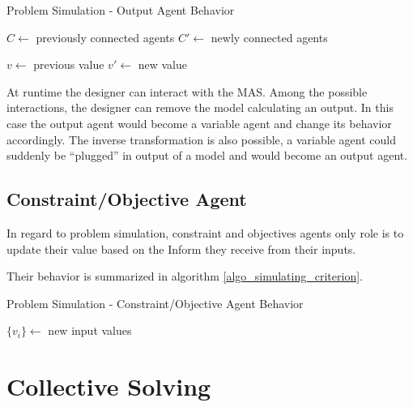 \begin{algorithm}
\caption{Problem Simulation - Output Agent Behavior}
\label{algo_simulating_output}

	$C \leftarrow$ previously connected agents\;
	$C'\leftarrow$ newly connected agents\;
		
	$v \leftarrow$ previous value\;
	$v'\leftarrow$ new value\;
	
	
	
\end{algorithm}

At runtime the designer can interact with the MAS. Among the possible interactions, the designer can remove the model calculating an output. In this case the output agent would become a variable agent and change its behavior accordingly. The inverse transformation is also possible, a variable agent could suddenly be \enquote{plugged} in output of a model and would become an output agent.

\subsection{Constraint/Objective Agent}

In regard to problem simulation, constraint and objectives agents only role is to update their value based on the Inform they receive from their inputs.

Their behavior is summarized in algorithm \ref{algo_simulating_criterion}.

\begin{algorithm}
\caption{Problem Simulation - Constraint/Objective Agent Behavior}
\label{algo_simulating_criterion}

	$\{v_i\} \leftarrow$ new input values\;
			

\end{algorithm}

\section{Collective Solving}\label{collective_solv}

